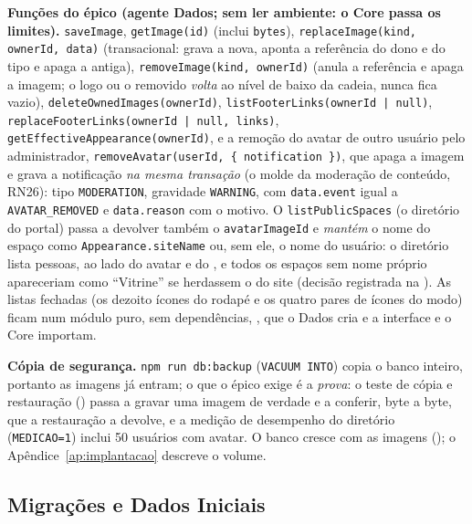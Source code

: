 \textbf{Funções do épico (agente Dados; sem ler ambiente: o Core passa os limites).} \texttt{saveImage}, \texttt{getImage(id)} (inclui \texttt{bytes}), \texttt{replaceImage(kind, ownerId, data)} (transacional: grava a nova, aponta a referência do dono e do tipo e apaga a antiga), \texttt{removeImage(kind, ownerId)} (anula a referência e apaga a imagem; o logo ou o  removido \emph{volta} ao nível de baixo da cadeia, nunca fica vazio), \texttt{deleteOwnedImages(ownerId)}, \texttt{listFooterLinks(ownerId | null)}, \texttt{replaceFooterLinks(ownerId | null, links)}, \texttt{getEffectiveAppearance(ownerId)}, e a remoção do avatar de outro usuário pelo administrador, \texttt{removeAvatar(userId, \{ notification \})}, que apaga a imagem e grava a notificação \emph{na mesma transação} (o molde da moderação de conteúdo, RN26): tipo \texttt{MODERATION}, gravidade \texttt{WARNING}, com \texttt{data.event} igual a \texttt{AVATAR\_REMOVED} e \texttt{data.reason} com o motivo. O \texttt{listPublicSpaces} (o diretório do portal) passa a devolver também o \texttt{avatarImageId} e \emph{mantém} o nome do espaço como \texttt{Appearance.siteName} ou, sem ele, o nome do usuário: o diretório lista pessoas, ao lado do avatar e do , e todos os espaços sem nome próprio apareceriam como ``Vitrine'' se herdassem o do site (decisão registrada na ). As listas fechadas (os dezoito ícones do rodapé e os quatro pares de ícones do modo) ficam num módulo puro, sem dependências, , que o Dados cria e a interface e o Core importam.

\textbf{Cópia de segurança.} \texttt{npm run db:backup} (\texttt{VACUUM INTO}) copia o banco inteiro, portanto as imagens já entram; o que o épico exige é a \emph{prova}: o teste de cópia e restauração () passa a gravar uma imagem de verdade e a conferir, byte a byte, que a restauração a devolve, e a medição de desempenho do diretório (\texttt{MEDICAO=1}) inclui 50 usuários com avatar. O banco cresce com as imagens (); o Apêndice~\ref{ap:implantacao} descreve o volume.

\subsection{Migrações e Dados Iniciais}

